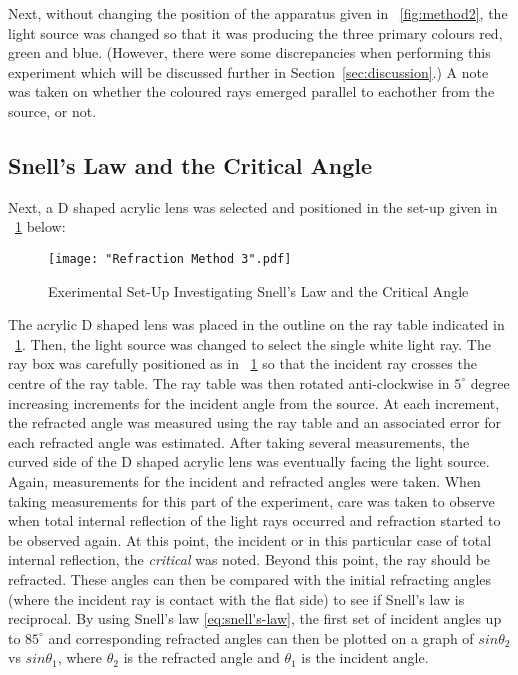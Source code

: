 \documentclass{article}
\newcommand{\figref}[2][\figurename~]{#1\ref{#2}}
\newcommand{\secref}[2][Section~]{#1\ref{#2}}
\begin{document}
\vspace{2mm}
\noindent
Next, without changing the position of the apparatus given in \figref{fig:method2}, the light source was changed so that it was producing the three primary colours \cite{Paper01} red, green and blue. (However, there were some discrepancies when performing this experiment which will be discussed further in \secref{sec:discussion}.) A note was taken on whether the coloured rays emerged parallel to eachother from the source, or not.

\subsection{Snell's Law and the Critical Angle}
\label{ssec:snell's-law}

Next, a D shaped acrylic lens was selected and positioned in the set-up given in \figref{fig:method3} below:

\begin{figure}[h]
\centering
\texttt{[image: "Refraction Method 3".pdf]}
\caption{Exerimental Set-Up Investigating Snell's Law and the Critical Angle}
\label{fig:method3}
\end{figure}

\vspace{20mm}
\noindent
The acrylic D shaped lens was placed in the outline on the ray table indicated in \figref{fig:method3}. Then, the light source was changed to select the single white light ray. The ray box was carefully positioned as in \figref{fig:method3} so that the incident ray crosses the centre of the ray table. The ray table was then rotated anti-clockwise in $5^{\circ}$ degree increasing increments for the incident angle from the source. At each increment, the refracted angle was measured using the ray table and an associated error for each refracted angle was estimated. After taking several measurements, the curved side of the D shaped acrylic lens was eventually facing the light source. Again, measurements for the incident and refracted angles were taken. When taking measurements for this part of the experiment, care was taken to observe when total internal reflection of the light rays occurred and refraction started to be observed again. At this point, the incident or in this particular case of total internal reflection, the \textit{critical} was noted. Beyond this point, the ray should be refracted. These angles can then be compared with the initial refracting angles (where the incident ray is contact with the flat side) to see if Snell's law is reciprocal. By using Snell's law \eqref{eq:snell's-law}, the first set of incident angles up to $85^{\circ}$ and corresponding refracted angles can then be plotted on a graph of $sin\theta_2$ vs $sin\theta_1$, where $\theta_2$ is the refracted angle and $\theta_1$ is the incident angle.
\end{document}
